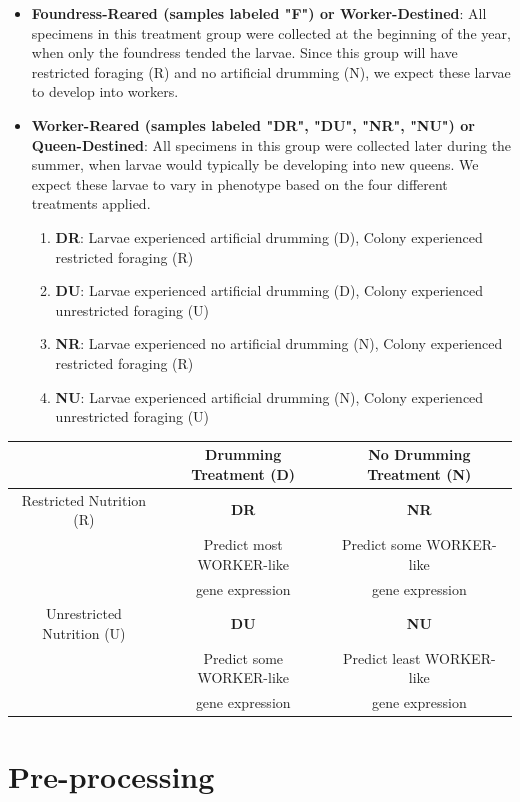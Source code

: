 \documentclass[11pt,a4paper,oldfontcommands,openany]{memoir}
\numberwithin{equation}{section} %
\begin{document}
\begin{itemize}
\item \textbf{Foundress-Reared (samples labeled "F") or Worker-Destined}: 
All specimens in this treatment group were collected at the beginning of the year, when only the foundress tended the larvae. Since this group will have restricted foraging (R) and no artificial drumming (N), we expect these larvae to develop into workers.
\item \textbf{Worker-Reared (samples labeled "DR", "DU", "NR", "NU") or Queen-Destined}:
All specimens in this group were collected later during the summer, when larvae would typically be developing into new queens. We expect these larvae to vary in phenotype based on the four different treatments applied.
\begin{enumerate}
\item \textbf{DR}: Larvae experienced artificial drumming (D), Colony experienced restricted foraging (R)
\item \textbf{DU}: Larvae experienced artificial drumming (D), Colony experienced unrestricted foraging (U)
\item \textbf{NR}: Larvae experienced no artificial drumming (N), Colony experienced restricted foraging (R)
\item \textbf{NU}: Larvae experienced artificial drumming (N), Colony experienced unrestricted foraging (U)
\end{enumerate}
\end{itemize}

\begin{center}
\begin{tabular}{ |c|c|c| } 
 \hline
 & Drumming Treatment (D) & No Drumming Treatment (N) \\ 
 \hline
 Restricted Nutrition (R) & \textbf{DR} & \textbf{NR} \\ 
 & Predict most WORKER-like & Predict some WORKER-like \\
 & gene expression & gene expression \\
 \hline
 Unrestricted Nutrition (U) & \textbf{DU} & \textbf{NU} \\ 
 & Predict some WORKER-like & Predict least WORKER-like \\
 & gene expression & gene expression \\
 \hline
\end{tabular}
\end{center}

\section{Pre-processing}
\end{document}
